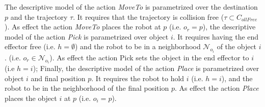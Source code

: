 
The descriptive model of the action \emph{MoveTo}  is parametrized over the destination $p$ and the trajectory $\tau$. It requires that the trajectory is collision free ($\tau \subset C_{ollFree}$). As effect the action \emph{MoveTo} places the robot at $p$ (i.e. $o_r = p$), the descriptive model of the action \emph{Pick} is parametrized over object $i$. It requires having the end effector free (i.e. $h  =  \emptyset$) and the robot to be in a neighborhood $\mathcal{N}_{o_i}$ of the object $i$. (i.e. $o_r \in \mathcal{N}_{o_i}$). As effect the action Pick sets the object in the end effector to $i$ (i.e $h = i$); %
Finally, the  descriptive model of the action \emph{Place} is parametrized over object $i$ and final position $p$. It requires the robot to hold $i$ (i.e. $h = i$), and the robot to be in the neighborhood of the final position $p$. As effect the action \emph{Place} places the object $i$ at $p$ (i.e. $o_i = p$).


